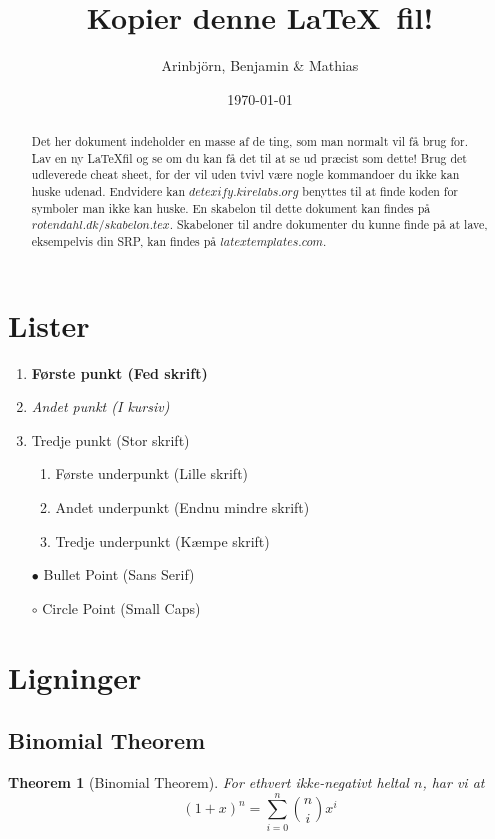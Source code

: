 \documentclass[]{article} %
\newtheorem{theorem}{Theorem}
\begin{document}
\title{Kopier denne \LaTeX ~fil!}
\author{Arinbjörn, Benjamin \& Mathias}
\date{\today}
\maketitle
\tableofcontents

\begin{abstract}
	Det her dokument indeholder en masse af de ting, som man normalt vil få brug for.
	Lav en ny \LaTeX fil og se om du kan få det til at se ud præcist som dette! 
	Brug det udleverede cheat sheet, for der vil uden tvivl være nogle kommandoer
	du ikke kan huske udenad. Endvidere kan $detexify.kirelabs.org$ benyttes til
	at finde koden for symboler man ikke kan huske. En skabelon til dette dokument
	kan findes på $rotendahl.dk/skabelon.tex$. Skabeloner til andre dokumenter du
	kunne finde på at lave, eksempelvis din SRP, kan findes på $latextemplates.com$.
\end{abstract}
\newpage

\section{Lister}
\begin{enumerate}
	\item {\bf Første punkt (Fed skrift)}
	\item {\em Andet punkt (I kursiv)}
	\item {\Large Tredje punkt (Stor skrift)}
	\begin{enumerate}
	    \item {\small Første underpunkt (Lille skrift)} 
	    \item {\tiny Andet underpunkt (Endnu mindre skrift)} 
	    \item {\Huge Tredje underpunkt (Kæmpe skrift)} 
	\end{enumerate}
	\item[$\bullet$] {\sf Bullet Point (Sans Serif)}
	\item[$\circ$] {\sc Circle Point (Small Caps)} 
\end{enumerate}

\section{Ligninger}
\subsection{Binomial Theorem}
\begin{theorem}[Binomial Theorem]
For ethvert ikke-negativt heltal $n$, har vi at 
\[
	(1+x)^n = \sum_{i=0}^n {n \choose i} x^i
\]
\end{theorem}
\end{document}
